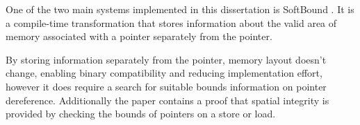 One of the two main systems implemented in this dissertation is SoftBound \cite{nagarakatte2009softbound}.
It is a compile-time transformation that stores information about the valid area of memory associated with a pointer separately from the pointer.

By storing information separately from the pointer, memory layout doesn't change, enabling binary compatibility and reducing implementation effort, however it does require a search for suitable bounds information on pointer dereference.
Additionally the paper contains a proof that spatial integrity is provided by checking the bounds of pointers on a store or load.

